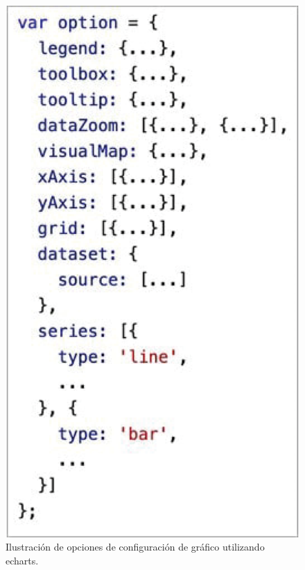 \begin{figure}[htpb]
	\centering
	\includegraphics[scale=.60]{./Figures/echart-grafica-options.png}
	\caption[Opciones de configuración de echarts]{Ilustración de opciones de configuración de gráfico utilizando echarts\protect\footnotemark.}
	\label{fig:echart-grafica-opciones}
\end{figure}



